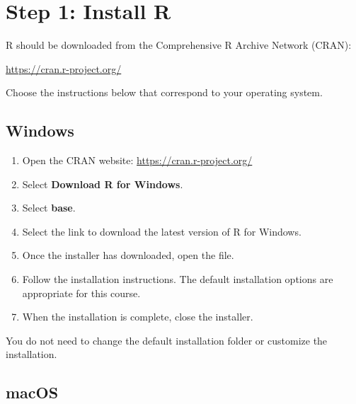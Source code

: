 \documentclass[11pt]{article}
\begin{document}

\section{Step 1: Install R}

R should be downloaded from the Comprehensive R Archive Network (CRAN):

\begin{center}
\url{https://cran.r-project.org/}
\end{center}

Choose the instructions below that correspond to your operating system.


\subsection{Windows}

\begin{enumerate}
    \item Open the CRAN website: \url{https://cran.r-project.org/}
    \item Select \textbf{Download R for Windows}.
    \item Select \textbf{base}.
    \item Select the link to download the latest version of R for Windows.
    \item Once the installer has downloaded, open the file.
    \item Follow the installation instructions. The default installation options are appropriate for this course.
    \item When the installation is complete, close the installer.
\end{enumerate}

You do not need to change the default installation folder or customize the installation.


\subsection{macOS}
\end{document}

